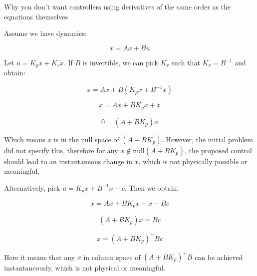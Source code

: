 \documentclass[12pt]{article}
\begin{document}
\large %



\begin{center}
{\Large Why you don't want controllers using derivatives of the same order as the equations themselves} 
\end{center}
\vspace{0.05in}


\begin{flushleft}


Assume we have dynamics:

\[
\dot x = Ax + Bu
\]

Let $u =  K_p x + K_v \dot x $. If $B$ is invertible, we can pick $K_v$ such that $K_v = B^{-1}$ and obtain:

\[
\dot x = Ax + B(K_p x + B^{-1} \dot x)
\]

\[
\dot x = Ax + B K_p x + \dot x
\]

\[
0 = (A + B K_p) x
\]

Which means $x$ is in the null space of $(A + B K_p)$. However, the initial problem did not specify this, therefore for any $x \not\in \text{null}(A + B K_p)$, the proposed control should lead to an instantaneous change in $x$, which is not physically possible or meaningful.

\end{flushleft}

\bigskip

\begin{flushleft}

Alternatively, pick $u =  K_p x + B^{-1} \dot x  - c$. Then we obtain:

\[
\dot x = Ax + B K_p x + \dot x - B c
\]

\[
(A + B K_p) x = B c
\]

\[
 x = (A + B K_p)^+ B c
\]


Here it means that any $x$ in column space of $(A + B K_p)^+ B$ can be achieved instantaneously, which is not physical or meaningful.

\end{flushleft}
\end{document}
